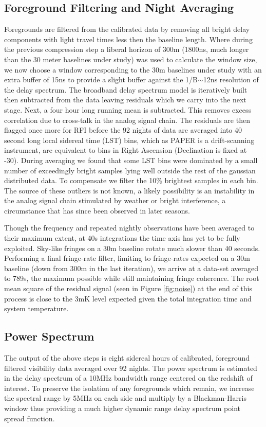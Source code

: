 \documentclass[preprint2]{aastex}
\begin{document}
\subsection{Foreground Filtering and Night Averaging}
Foregrounds are filtered from the calibrated data by removing all bright delay components with light travel times less then the baseline length. Where during the previous compression step a liberal horizon of 300m (1800ns, much longer than the 30 meter baselines under study)  was used to calculate the window size, we now choose a window corresponding to the 30m baselines under study with an extra buffer of 15ns to provide a slight buffer against the 1/B$\sim$12ns resolution of the delay spectrum.  The broadband delay spectrum model is iteratively built then subtracted from the data leaving residuals which we carry into the next stage. Next, a four hour long running mean is subtracted. This removes excess correlation due to cross-talk in the analog signal chain. The residuals are then flagged once more for RFI before the 92 nights of data are averaged into 40 second long local sidereal time (LST) bins, which as PAPER is a drift-scanning instrument, are equivalent to bins in Right Ascension (Declination is fixed at -30\arcdeg).  During averaging we found that some LST bins were dominated by a small number of exceedingly bright samples lying well outside the rest of the gaussian distributed data. To compensate we filter the 10\% brightest samples in each bin.  The source of these outliers is not known,  a likely possibility is an instability in the analog signal chain stimulated by weather or bright interference, a circumstance that has since been observed in later seasons. 


Though the frequency and repeated nightly observations have been averaged to their maximum extent, at 40s integrations the time axis has yet to be fully exploited.  Sky-like fringes on a 30m baseline rotate much slower than 40 seconds.  Performing a final fringe-rate filter, limiting to fringe-rates expected on a 30m baseline (down from 300m in the last iteration), we arrive at a data-set averaged to 789s, the maximum possible while still maintaining fringe coherence.    The root mean square of the residual signal (seen in Figure \ref{fig:noise}) at the end of this process is close to the 3mK level expected given the total integration time and  system temperature.  


\subsection{Power Spectrum}
\label{sec:power_spectrum}
The output of the above steps is eight sidereal hours of calibrated, foreground filtered visibility data averaged over 92 nights. The power spectrum is estimated in the delay spectrum of  a 10MHz bandwidth range centered on the redshift of interest. To preserve the isolation of any foregrounds which remain, we increase the spectral range by 5MHz on each side and multiply by a Blackman-Harris window thus providing a much higher dynamic range delay spectrum point spread function. 
\end{document}
